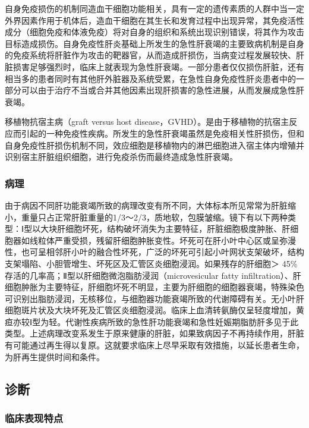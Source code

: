 自身免疫损伤的机制同造血干细胞功能相关，具有一定的遗传素质的人群中当一定外界因素作用于机体后，造血干细胞在其生长和发育过程中出现异常，其免疫活性成分（细胞免疫和体液免疫）将对自身的组织和系统出现识别错误，将其作为攻击目标造成损伤。自身免疫性肝炎基础上所发生的急性肝衰竭的主要致病机制是自身的免疫系统将肝脏作为攻击的靶器官，从而造成肝损伤，当病变过程发展较快、肝脏损害足够强烈时，临床上就表现为急性肝衰竭。一部分患者仅仅损伤肝脏，还有相当多的患者同时有其他肝外脏器及系统受累，在急性自身免疫性肝炎患者中的一部分可以由于治疗不当或合并其他因素出现肝损害的急性进展，从而发展成急性肝衰竭。

移植物抗宿主病（graft versus host
disease，GVHD）。是由于移植物的抗宿主反应而引起的一种免疫性疾病。所发生的急性肝衰竭虽然是免疫相关性肝损伤，但和自身免疫性肝损伤机制不同，效应细胞是移植物内的淋巴细胞进入宿主体内增殖并识别宿主肝脏组织细胞，进行免疫杀伤而最终造成急性肝衰竭。

\subsubsection{病理}

由于病因不同肝功能衰竭所致的病理改变有所不同，大体标本所见常常为肝脏缩小，重量只占正常肝脏重量的1/3～2/3，质地软，包膜皱缩。镜下有以下两种类型：Ⅰ型以大块肝细胞坏死，结构破坏消失为主要特征，肝脏细胞极度肿胀、肝细胞器如线粒体严重受损，残留肝细胞肿胀变性。坏死可在肝小叶中心区或呈弥漫性，也可呈相邻肝小叶的融合性坏死，广泛的坏死可引起小叶网状支架破坏，结构支架塌陷、小胆管增生、坏死区及汇管区炎细胞浸润。如果残存的肝细胞＞
45\%存活的几率高；Ⅱ型以肝细胞微泡脂肪浸润（microvesicular fatty
infiltration）、肝细胞肿胀为主要特征，肝细胞坏死不明显，主要为肝细胞的细胞器衰竭，特殊染色可识别出脂肪浸润，无核移位，与细胞器功能衰竭所致的代谢障碍有关。无小叶肝细胞斑片状及大块坏死及汇管区炎细胞浸润。临床上血清转氨酶仅呈轻度增加，黄疸亦较Ⅰ型为轻。代谢性疾病所致的急性肝功能衰竭和急性妊娠期脂肪肝多见于此类型。上述病理改变系发生于原来健康的肝脏，如果致病因子不再持续作用，肝脏有可能通过再生得以复原。这就要求临床上尽早采取有效措施，以延长患者生命，为肝再生提供时间和条件。

\subsection{诊断}

\subsubsection{临床表现特点}

